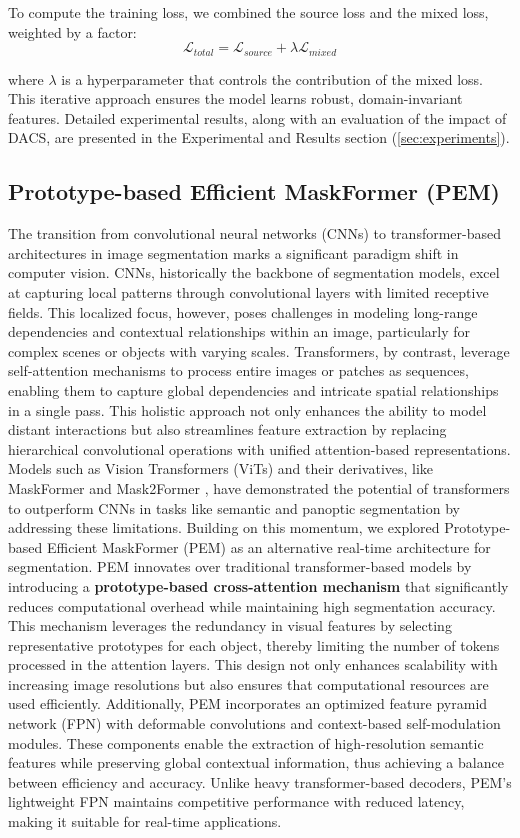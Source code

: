 \documentclass[10pt,twocolumn,letterpaper]{article}
\begin{document}
To compute the training loss, we combined the source loss and the mixed loss, weighted by a factor: $$
    \mathcal{L}_{total} = \mathcal{L}_{source} + \lambda \mathcal{L}_{mixed} $$

where $\lambda$ is a hyperparameter that controls the contribution of the mixed loss.
This iterative approach ensures the model learns robust, domain-invariant features. Detailed experimental results, along with an evaluation of the impact of DACS, are presented in the Experimental and Results section (\ref{sec:experiments}).

\subsection{Prototype-based Efficient MaskFormer (PEM)}

The transition from convolutional neural networks (CNNs) to transformer-based architectures in image segmentation marks a significant paradigm shift in computer vision. CNNs, historically the backbone of segmentation models, excel at capturing local patterns through convolutional layers with limited receptive fields. This localized focus, however, poses challenges in modeling long-range dependencies and contextual relationships within an image, particularly for complex scenes or objects with varying scales. Transformers, by contrast, leverage self-attention mechanisms to process entire images or patches as sequences, enabling them to capture global dependencies and intricate spatial relationships in a single pass. This holistic approach not only enhances the ability to model distant interactions but also streamlines feature extraction by replacing hierarchical convolutional operations with unified attention-based representations. Models such as Vision Transformers (ViTs) and their derivatives, like MaskFormer \cite{cheng2021maskformer} and Mask2Former \cite{cheng2021mask2former}, have demonstrated the potential of transformers to outperform CNNs in tasks like semantic and panoptic segmentation by addressing these limitations.
Building on this momentum, we explored Prototype-based Efficient MaskFormer (PEM) \cite{cavagnero2024pem} as an alternative real-time architecture for segmentation. 
PEM innovates over traditional transformer-based models by introducing a \textbf{prototype-based cross-attention mechanism} that significantly reduces computational overhead while maintaining high segmentation accuracy. This mechanism leverages the redundancy in visual features by selecting representative prototypes for each object, thereby limiting the number of tokens processed in the attention layers. This design not only enhances scalability with increasing image resolutions but also ensures that computational resources are used efficiently.
Additionally, PEM incorporates an optimized feature pyramid network (FPN) with deformable convolutions and context-based self-modulation modules. These components enable the extraction of high-resolution semantic features while preserving global contextual information, thus achieving a balance between efficiency and accuracy. Unlike heavy transformer-based decoders, PEM’s lightweight FPN maintains competitive performance with reduced latency, making it suitable for real-time applications. 
\end{document}
